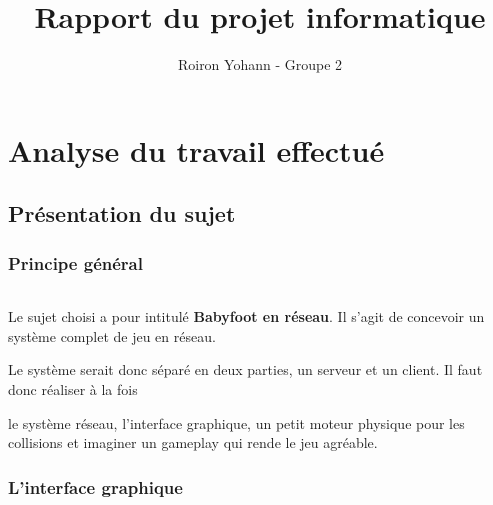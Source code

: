 \documentclass[a4paper,12pt]{report}
\title{Rapport du projet informatique}
\author{Roiron Yohann - Groupe 2}
\begin{document}
\maketitle
\tableofcontents
\newpage
\part{Analyse du travail effectué}





\chapter{Présentation du sujet}




\section{Principe général}

\paragraph{}

Le sujet choisi a pour intitulé \textbf{Babyfoot en réseau}. Il s'agit de concevoir un système complet de jeu en réseau.

Le système serait donc séparé en deux parties, un serveur et un client. Il faut donc réaliser à la fois

le système réseau, l'interface graphique, un petit moteur physique pour les collisions et imaginer un gameplay qui rende le jeu agréable.




\section{L'interface graphique}

\paragraph{}
\end{document}
